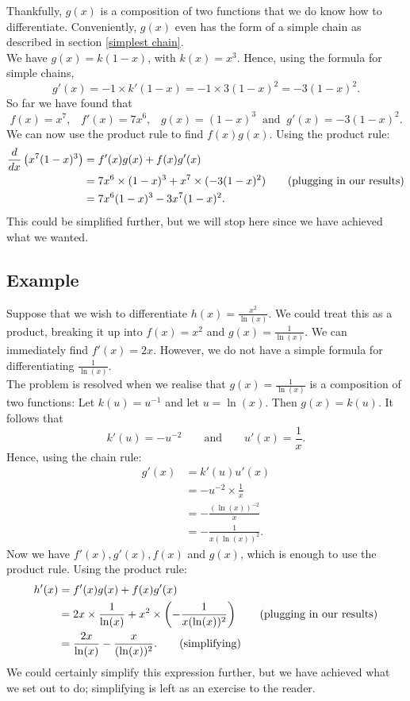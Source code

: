 \noindent Thankfully, $g(x)$ is a composition of two functions that we do know how to differentiate. Conveniently, $g(x)$ even has the form of a simple chain as described in section \ref{simplest chain}. \\

\noindent We have $g(x) = k(1-x)$, with $k(x) = x^3$. Hence, using the formula for simple chains,
\[
g'(x) = -1\times k'(1-x) = -1\times3(1-x)^2 = -3(1-x)^2.
\]
So far we have found that
\[
f(x) = x^7, \;\;\; f'(x) = 7x^6, \;\;\; g(x) = (1-x)^3 \;\; \text{and} \;\; g'(x) = -3(1-x)^2.
\]
We can now use the product rule to find $f(x)g(x)$. Using the product rule:
\begin{align*}
\frac{d}{dx}\left(x^7(1-x)^3\right) & = f'(x)g(x) + f(x)g'(x) \\
		& = 7x^6 \times(1-x)^3 + x^7\times(-3(1-x)^2) \tag{plugging in our results} \\
		& = 7x^6(1-x)^3 - 3x^7(1-x)^2.
\end{align*}
This could be simplified further, but we will stop here since we have achieved what we wanted.

\subsection{Example} \label{ex16.4}
Suppose that we wish to differentiate $h(x) = \frac{x^2}{\ln(x)}$. We could treat this as a product, breaking it up into $f(x) = x^2$ and $g(x) = \frac{1}{\ln(x)}$. We can immediately find $f'(x) = 2x$. However, we do not have a simple formula for differentiating $\frac{1}{\ln(x)}$. \\

\noindent The problem is resolved when we realise that $g(x) = \frac{1}{\ln(x)}$ is a composition of two functions: Let $k(u) = u^{-1}$ and let $u = \ln(x)$. Then $g(x) = k(u)$. It follows that
\[
k'(u) = -u^{-2} \qquad \text{and} \qquad u'(x) = \frac{1}{x}. \tag{derivative formulas}
\]
Hence, using the chain rule:
\begin{align*}
g'(x) & = k'(u)u'(x) \\
	& = -u^{-2}\times\frac{1}{x} \tag{derivative formulas} \\
	& = -\frac{(\ln(x))^{-2}}{x} \tag{since $u = \ln(x)$} \\
	& = -\frac{1}{x(\ln(x))^2}. \tag{index laws}
\end{align*}
Now we have $f'(x),g'(x),f(x)$ and $g(x)$, which is enough to use the product rule. Using the product rule:
\begin{align*}
h'(x) & = f'(x)g(x) + f(x)g'(x) \\
	& = 2x\times\frac{1}{\ln(x)} + x^2\times\left(-\frac{1}{x(\ln(x))^2}\right) \tag{plugging in our results} \\
	& = \frac{2x}{\ln(x)} - \frac{x}{(\ln(x))^2}. \tag{simplifying}
\end{align*}
We could certainly simplify this expression further, but we have achieved what we set out to do; simplifying is left as an exercise to the reader.

